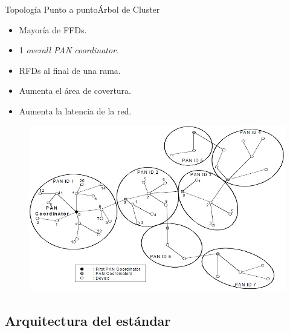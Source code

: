 \documentclass[aspectratio=169]{beamer}
\begin{document}
\begin{frame}{Topología Punto a punto}{Árbol de Cluster}
\begin{minipage}[c]{1.0\linewidth}
\begin{minipage}[c]{0.45\linewidth}
		\begin{itemize}
			\item Mayoría de FFDs.
			\vspace{10px}
			\item 1 \textit{overall PAN coordinator}.
			\vspace{10px}
			\item RFDs al final de una rama.
			\vspace{10px}
			\item Aumenta el área de covertura.
			\vspace{10px}
			\item Aumenta la latencia de la red.
		\end{itemize}	
	\end{minipage}
	\hspace{-15px}
	\begin{minipage}[c]{0.65\linewidth}
		\begin{figure}[H]
			{\includegraphics[width=.8\textwidth]{./imagenes/cluster}}
		\end{figure}	  	  	
	\end{minipage}
\end{minipage}
\end{frame}

\subsection[Arquitectura]{Arquitectura del estándar}
\end{document}
